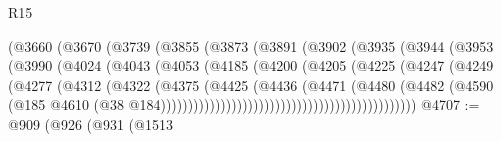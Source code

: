 \begin{lexlean}{R15}
\begin{coremodule}
{{{{{{{{{{{                                  (@3660
                                    (@3670
                                      (@3739
                                        (@3855
                                          (@3873
                                            (@3891
                                              (@3902
                                                (@3935
                                                  (@3944
                                                    (@3953
                                                      (@3990
                                                        (@4024
                                                          (@4043
                                                            (@4053
                                                              (@4185
                                                                (@4200
                                                                  (@4205
                                                                    (@4225
                                                                      (@4247
                                                                        (@4249
                                                                          (@4277
                                                                            (@4312
                                                                              (@4322
                                                                                (@4375
                                                                                  (@4425
                                                                                    (@4436
                                                                                      (@4471
                                                                                        (@4480
                                                                                          (@4482
                                                                                            (@4590
                                                                                              (@185
                                                                                                @4610
                                                                                                (@38
                                                                                                  @184)))))))))))))))))))))))))))))))))))))))))))))))
@4707 := @909
    (@926
      (@931
        (@1513
}}}}}}}}}}}
\end{coremodule}
\end{lexlean}
